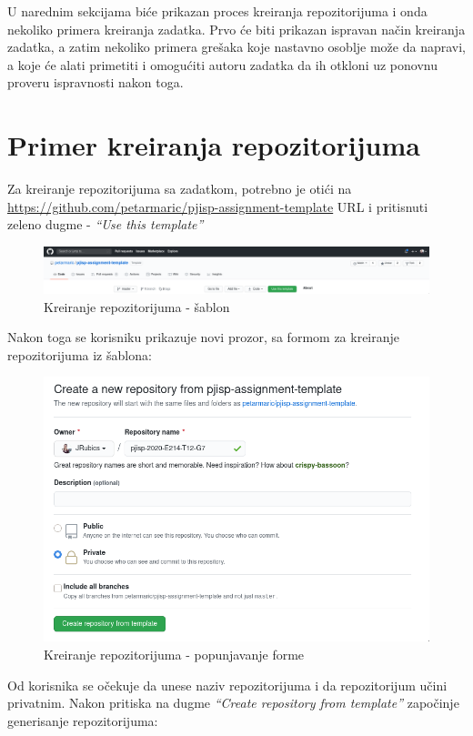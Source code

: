 \documentclass[12pt]{report}
\begin{document}
U narednim sekcijama biće prikazan proces kreiranja repozitorijuma i onda nekoliko primera kreiranja zadatka. Prvo će biti prikazan ispravan način kreiranja zadatka, a zatim nekoliko primera grešaka koje nastavno osoblje može da napravi, a koje će alati primetiti i omogućiti autoru zadatka da ih otkloni uz ponovnu proveru ispravnosti nakon toga.

\section{Primer kreiranja repozitorijuma}

Za kreiranje repozitorijuma sa zadatkom, potrebno je otići na \url{https://github.com/petarmaric/pjisp-assignment-template} URL i pritisnuti zeleno dugme - \textit{``Use this template''}


\begin{figure}[H]
    \centering
    \includegraphics[width=\linewidth]{images/1.png}
    \caption{Kreiranje repozitorijuma - šablon}
\end{figure}

Nakon toga se korisniku prikazuje novi prozor, sa formom za kreiranje repozitorijuma iz šablona:

\begin{figure}[H]
    \centering
    \includegraphics[width=0.7\linewidth]{images/2.png}
    \caption{Kreiranje repozitorijuma - popunjavanje forme}
\end{figure}

Od korisnika se očekuje da unese naziv repozitorijuma i da repozitorijum učini privatnim. Nakon pritiska na dugme \textit{``Create repository from template''} započinje generisanje repozitorijuma:
\end{document}
